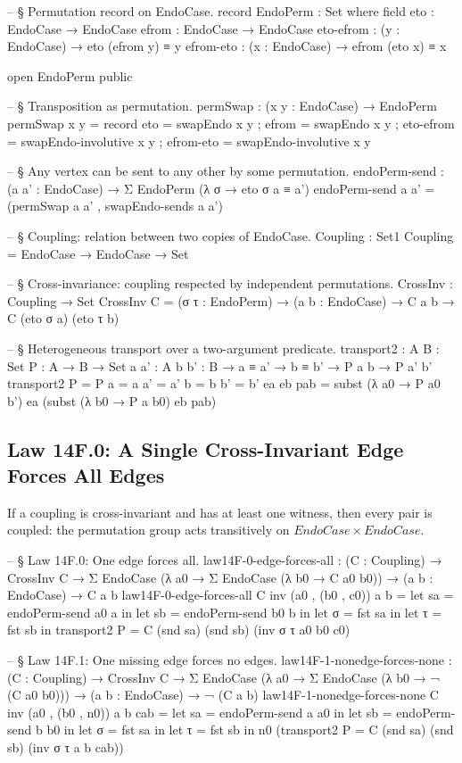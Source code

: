 \documentclass[11pt,a4paper]{book}
\def\mathrm#1{#1}%
\begin{document}
\begin{code}
-- § Permutation record on EndoCase.
record EndoPerm : Set where
  field
    eto       : EndoCase → EndoCase
    efrom     : EndoCase → EndoCase
    eto-efrom : (y : EndoCase) → eto (efrom y) ≡ y
    efrom-eto : (x : EndoCase) → efrom (eto x) ≡ x

open EndoPerm public

-- § Transposition as permutation.
permSwap : (x y : EndoCase) → EndoPerm
permSwap x y = record
  { eto = swapEndo x y
  ; efrom = swapEndo x y
  ; eto-efrom = swapEndo-involutive x y
  ; efrom-eto = swapEndo-involutive x y
  }

-- § Any vertex can be sent to any other by some permutation.
endoPerm-send : (a a' : EndoCase) → Σ EndoPerm (λ σ → eto σ a ≡ a')
endoPerm-send a a' = (permSwap a a' , swapEndo-sends a a')

-- § Coupling: relation between two copies of EndoCase.
Coupling : Set1
Coupling = EndoCase → EndoCase → Set

-- § Cross-invariance: coupling respected by independent permutations.
CrossInv : Coupling → Set
CrossInv C = (σ τ : EndoPerm) → (a b : EndoCase) → C a b → C (eto σ a) (eto τ b)

-- § Heterogeneous transport over a two-argument predicate.
transport2 : {A B : Set} {P : A → B → Set} {a a' : A} {b b' : B} → a ≡ a' → b ≡ b' → P a b → P a' b'
transport2 {P = P} {a = a} {a' = a'} {b = b} {b' = b'} ea eb pab =
  subst (λ a0 → P a0 b') ea (subst (λ b0 → P a b0) eb pab)
\end{code}

\subsection{Law 14F.0: A Single Cross-Invariant Edge Forces All Edges}

If a coupling is cross-invariant and has at least one witness, then every pair is coupled:
the permutation group acts transitively on $\mathrm{EndoCase} \times \mathrm{EndoCase}$.

\begin{code}
-- § Law 14F.0: One edge forces all.
law14F-0-edge-forces-all : (C : Coupling) → CrossInv C →
  Σ EndoCase (λ a0 → Σ EndoCase (λ b0 → C a0 b0)) →
  (a b : EndoCase) → C a b
law14F-0-edge-forces-all C inv (a0 , (b0 , c0)) a b =
  let sa = endoPerm-send a0 a in
  let sb = endoPerm-send b0 b in
  let σ = fst sa in
  let τ = fst sb in
  transport2 {P = C} (snd sa) (snd sb) (inv σ τ a0 b0 c0)

-- § Law 14F.1: One missing edge forces no edges.
law14F-1-nonedge-forces-none : (C : Coupling) → CrossInv C →
  Σ EndoCase (λ a0 → Σ EndoCase (λ b0 → ¬ (C a0 b0))) →
  (a b : EndoCase) → ¬ (C a b)
law14F-1-nonedge-forces-none C inv (a0 , (b0 , n0)) a b cab =
  let sa = endoPerm-send a a0 in
  let sb = endoPerm-send b b0 in
  let σ = fst sa in
  let τ = fst sb in
  n0 (transport2 {P = C} (snd sa) (snd sb) (inv σ τ a b cab))
\end{code}
\end{document}
